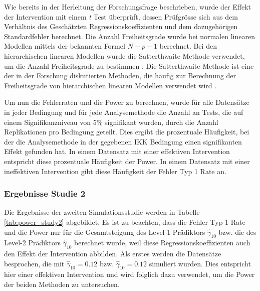 \documentclass[12pt]{article}\usepackage[]{graphicx}\usepackage[]{color}
\begin{document}
Wie bereits in der Herleitung der Forschungsfrage beschrieben, wurde der Effekt der Intervention mit einem \textit{t} Test überprüft, dessen Prüfgrösse sich aus dem Verhältnis des Geschätzten Regressionskoeffizienten und dem dazugehörigen Standardfehler berechnet. Die Anzahl Freiheitsgrade wurde bei normalen linearen Modellen mittels der bekannten Formel $N - p - 1$ berechnet. Bei den hierarchischen linearen Modellen wurde die Satterthwaite Methode verwendet, um die Anzahl Freiheitsgrade zu bestimmen \citeyearpar{satter1941synthesis}. Die Satterthwaite Methode ist eine der in der Forschung diskutierten Methoden, die häufig zur Berechnung der Freiheitsgrade von hierarchischen linearen Modellen verwendet wird \citep{raudenbush2002hierarchical,SnijdersTomA.B2012Ma:a}. 

Um nun die Fehlerraten und die Power zu berechnen, wurde für alle Datensätze in jeder Bedingung und für jede Analysemethode die Anzahl an Tests, die auf einem Signifikanzniveau von 5\% signifikant wurden, durch die Anzahl Replikationen pro Bedingung geteilt. Dies ergibt die prozentuale Häufigkeit, bei der die Analysemethode in der gegebenen IKK Bedingung einen signifikanten Effekt gefunden hat. In einem Datensatz mit einer effektiven Intervention entspricht diese prozentuale Häufigkeit der Power. In einem Datensatz mit einer ineffektiven Intervention gibt diese Häufigkeit der Fehler Typ 1 Rate an.

\subsubsection{Ergebnisse Studie 2}
Die Ergebnisse der zweiten Simulationsstudie werden in Tabelle \ref{tab:power_study2} abgebildet. Es ist zu beachten, dass die Fehler Typ 1 Rate und die Power nur für die Gesamtsteigung des Level-1 Prädiktors $\widehat{\gamma}_{10}$ bzw. die des Level-2 Prädiktors $\widehat{\gamma}_{10}$ berechnet wurde, weil diese Regressionskoeffizienten auch den Effekt der Intervention abbilden. Als erstes werden die Datensätze besprochen, die mit $\widehat{\gamma}_{10} = 0.12$ bzw. $\widehat{\gamma}_{10} = 0.12$ simuliert wurden. Dies entspricht hier einer effektiven Intervention und wird folglich dazu verwendet, um die Power der beiden Methoden zu untersuchen.
\end{document}
